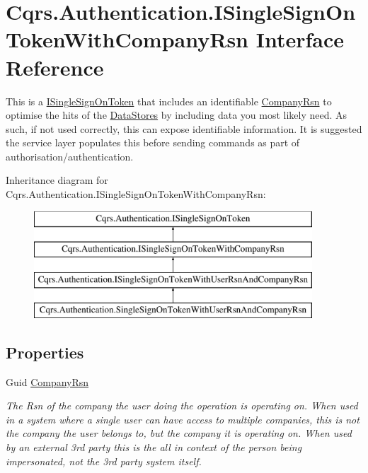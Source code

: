 \hypertarget{interfaceCqrs_1_1Authentication_1_1ISingleSignOnTokenWithCompanyRsn}{}\section{Cqrs.\+Authentication.\+I\+Single\+Sign\+On\+Token\+With\+Company\+Rsn Interface Reference}
\label{interfaceCqrs_1_1Authentication_1_1ISingleSignOnTokenWithCompanyRsn}


This is a \hyperlink{interfaceCqrs_1_1Authentication_1_1ISingleSignOnToken}{I\+Single\+Sign\+On\+Token} that includes an identifiable \hyperlink{interfaceCqrs_1_1Authentication_1_1ISingleSignOnTokenWithCompanyRsn_a26ffa6ca2e583f0ecc440b68fe3edd52}{Company\+Rsn} to optimise the hits of the \hyperlink{}{Data\+Stores} by including data you most likely need. As such, if not used correctly, this can expose identifiable information. It is suggested the service layer populates this before sending commands as part of authorisation/authentication.  


Inheritance diagram for Cqrs.\+Authentication.\+I\+Single\+Sign\+On\+Token\+With\+Company\+Rsn\+:\begin{figure}[H]
\begin{center}
\leavevmode
\includegraphics[height=4.000000cm]{interfaceCqrs_1_1Authentication_1_1ISingleSignOnTokenWithCompanyRsn}
\end{center}
\end{figure}
\subsection*{Properties}
\begin{DoxyCompactItemize}
\item 
Guid \hyperlink{interfaceCqrs_1_1Authentication_1_1ISingleSignOnTokenWithCompanyRsn_a26ffa6ca2e583f0ecc440b68fe3edd52}{Company\+Rsn}
\begin{DoxyCompactList}\small\item\em The Rsn of the company the user doing the operation is operating on. When used in a system where a single user can have access to multiple companies, this is not the company the user belongs to, but the company it is operating on. When used by an external 3rd party this is the all in context of the person being impersonated, not the 3rd party system itself. \end{DoxyCompactList}\end{DoxyCompactItemize}
